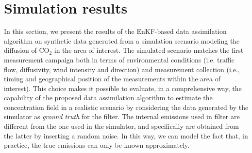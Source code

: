 \documentclass[journal]{IEEEtran}
\begin{document}
\section{Simulation results}
In this section, we present the results of the EnKF-based data assimilation algorithm on synthetic data generated from a simulation scenario modeling the diffusion of  
CO$_2$ in the area of interest. 
The simulated scenario matches the first measurement campaign both in terms of environmental conditions (i.e. traffic flow, diffusivity, wind intensity and direction) 
and measurement collection (i.e., timing and geographical position of the measurements within the area of interest).
This choice makes it possible to evaluate, in a comprehensive way, the capability of the proposed data assimilation algorithm to estimate the concentration field in a realistic scenario
by considering the data generated by the simulator as \textit{ground truth} for the filter. The internal emissions used in filter 
are different from the one used in the simulator, and specifically are obtained from the latter by inserting a random noise. In this way, we can model the fact that, in practice, the true emissions can
only be known approximately.
\end{document}
